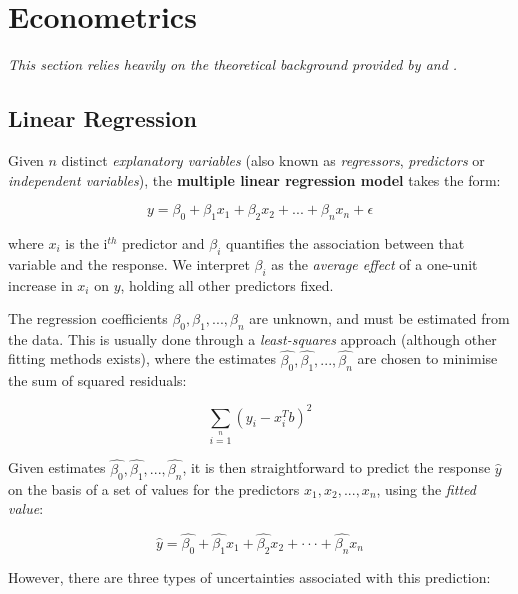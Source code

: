 \section{Econometrics}
\textit{This section relies heavily on the theoretical background provided by \cite{wooldridge} and \cite{introR}.}


\subsection{Linear Regression}
Given $n$ distinct \textit{explanatory variables} (also known as \textit{regressors}, \textit{predictors} or \textit{independent variables}), the \textbf{multiple linear regression model} takes the form:

\begin{equation}
    y = \beta_0 + \beta_1 x_1 + \beta_2 x_2 + ... + \beta_n x_n + \epsilon
\end{equation}

where $x_i$ is the i$^{th}$ predictor and $\beta_i$ quantifies the association between that variable and the response. We interpret $\beta_i$ as the \textit{average effect} of a one-unit increase in $x_i$ on $y$, holding all other predictors fixed.

The regression coefficients $\beta_0, \beta_1, ..., \beta_n$ are unknown, and must be estimated from the data. This is usually done through a \textit{least-squares} approach (although other fitting methods exists), where the estimates $\hat{\beta_0}, \hat{\beta_1}, ..., \hat{\beta_n}$ are chosen to minimise the sum of squared residuals:

\begin{equation}
    \sum\limits_{i=1}\limits^n (y_i - x_i ^T b)^2
\end{equation}

Given estimates $\hat{\beta_0}, \hat{\beta_1}, ..., \hat{\beta_n}$, it is then straightforward to predict the response $\hat{y}$ on the basis of a set of values for the predictors $x_1, x_2, ..., x_n$, using the \textit{fitted value}:

\begin{equation}
    \hat{y} = \hat{\beta_0} + \hat{\beta_1} x_1 + \hat{\beta_2} x_2 + ··· + \hat{\beta_n} x_n
\end{equation}

However, there are three types of uncertainties associated with this prediction:

